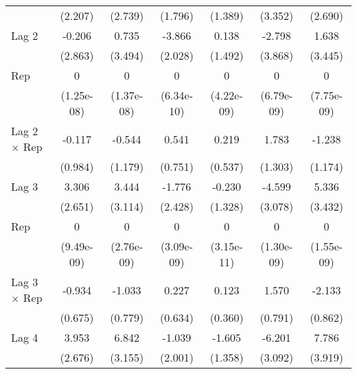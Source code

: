 \begin{table}[htbp]
\begin{tabular}{l*{6}{c}}
                &  (2.207)         &  (2.739)         &  (1.796)         &  (1.389)         &  (3.352)         &  (2.690)         \\
\addlinespace
Lag 2           &   -0.206         &    0.735         &   -3.866         &    0.138         &   -2.798         &    1.638         \\
                &  (2.863)         &  (3.494)         &  (2.028)         &  (1.492)         &  (3.868)         &  (3.445)         \\
\addlinespace
Rep             &        0         &        0         &        0         &        0         &        0         &        0         \\
                &(1.25e-08)         &(1.37e-08)         &(6.34e-10)         &(4.22e-09)         &(6.79e-09)         &(7.75e-09)         \\
\addlinespace
Lag 2 $\times$ Rep&   -0.117         &   -0.544         &    0.541         &    0.219         &    1.783         &   -1.238         \\
                &  (0.984)         &  (1.179)         &  (0.751)         &  (0.537)         &  (1.303)         &  (1.174)         \\
\addlinespace
Lag 3           &    3.306         &    3.444         &   -1.776         &   -0.230         &   -4.599         &    5.336         \\
                &  (2.651)         &  (3.114)         &  (2.428)         &  (1.328)         &  (3.078)         &  (3.432)         \\
\addlinespace
Rep             &        0         &        0         &        0         &        0         &        0         &        0         \\
                &(9.49e-09)         &(2.76e-09)         &(3.09e-09)         &(3.15e-11)         &(1.30e-09)         &(1.55e-09)         \\
\addlinespace
Lag 3 $\times$ Rep&   -0.934         &   -1.033         &    0.227         &    0.123         &    1.570\sym{*}  &   -2.133\sym{*}  \\
                &  (0.675)         &  (0.779)         &  (0.634)         &  (0.360)         &  (0.791)         &  (0.862)         \\
\addlinespace
Lag 4           &    3.953         &    6.842\sym{*}  &   -1.039         &   -1.605         &   -6.201\sym{*}  &    7.786\sym{*}  \\
                &  (2.676)         &  (3.155)         &  (2.001)         &  (1.358)         &  (3.092)         &  (3.919)         \\

\end{tabular}
\end{table}
